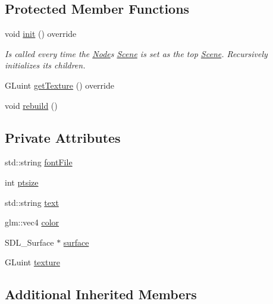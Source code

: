\subsection*{Protected Member Functions}
\begin{DoxyCompactItemize}
\item 
void \mbox{\hyperlink{classsage_1_1TextNode_ae389b7b4afae4d068ac29686343f279e}{init}} () override
\begin{DoxyCompactList}\small\item\em Is called every time the \mbox{\hyperlink{classsage_1_1Node}{Node}}\textquotesingle{}s \mbox{\hyperlink{classsage_1_1Scene}{Scene}} is set as the top \mbox{\hyperlink{classsage_1_1Scene}{Scene}}. Recursively initializes its children. \end{DoxyCompactList}\item 
G\+Luint \mbox{\hyperlink{classsage_1_1TextNode_ae21f17c6cb993692d8da89424b2581d7}{get\+Texture}} () override
\item 
void \mbox{\hyperlink{classsage_1_1TextNode_a7984e4a663f48338da018b780704b95f}{rebuild}} ()
\end{DoxyCompactItemize}
\subsection*{Private Attributes}
\begin{DoxyCompactItemize}
\item 
std\+::string \mbox{\hyperlink{classsage_1_1TextNode_a2e09c9e2e42c0c99ea24239aa09d03c9}{font\+File}}
\item 
int \mbox{\hyperlink{classsage_1_1TextNode_a1811c136026bea8ba6f27184e2d53c0c}{ptsize}}
\item 
std\+::string \mbox{\hyperlink{classsage_1_1TextNode_a2828e281a4ea3cce151de7cc983ca2c0}{text}}
\item 
glm\+::vec4 \mbox{\hyperlink{classsage_1_1TextNode_a005f3c7841dc825fb762cb84dc667088}{color}}
\item 
S\+D\+L\+\_\+\+Surface $\ast$ \mbox{\hyperlink{classsage_1_1TextNode_a6f15575871c6eef0b1a461aaa1b87ca2}{surface}}
\item 
G\+Luint \mbox{\hyperlink{classsage_1_1TextNode_a8ffd1a92389ec216de154ea9a5b211cc}{texture}}
\end{DoxyCompactItemize}
\subsection*{Additional Inherited Members}


